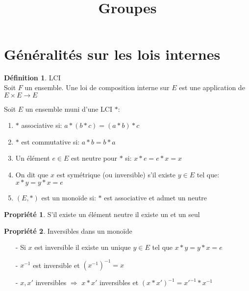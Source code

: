 \documentclass[fleqn]{article}
\title{Groupes}
\date{}
\theoremstyle{definition} \newtheorem*{defi}{D\'efinition}
\theoremstyle{definition} \newtheorem*{theo}{Th\'eor\`eme}
\theoremstyle{definition} \newtheorem*{coro}{Corollaire}
\theoremstyle{remark} \newtheorem*{rqs}{Remarques}
\theoremstyle{definition} \newtheorem*{prop}{Propri\'et\'e}
\begin{document}
\maketitle

\section{G\'en\'eralit\'es sur les lois internes}
\begin{defi} LCI \\
Soit $F$ un ensemble. Une loi de composition interne sur $E$ est une application de $E\times E \rightarrow E$
\end{defi}

Soit $E$ un ensemble muni d'une LCI $*$:
\begin{enumerate}
	\item $*$ associative si: $a*(b*c) = (a*b)*c$
	\item $*$ est commutative si: $a*b = b*a$
	\item Un \'el\'ement $e \in E$ est neutre pour $*$ si: $x*e = e*x = x$
	\item On dit que $x$ est sym\'etrique (ou inversible) s'il existe $y \in E$ tel que: $x*y = y*x = e$
	\item $(E,*)$ est un mono\"ide si: $*$ est associative et admet un neutre
\end{enumerate}

\begin{prop}
	S'il existe un \'el\'ement neutre il existe un et un seul
\end{prop}

\begin{prop} Inversibles dans un mono\"ide
	\begin{itemize}
		\item [-] Si $x$ est inversible il existe un unique $y \in E$ tel que $x*y = y*x = e$
		\item [-] $x^{-1}$ est inversible et $(x^{-1})^{-1} = x$
		\item [-] $x, x'$ inversibles $\Rightarrow$ $x*x'$ inversibles et $(x*x')^{-1} = x'^{-1}*x^{-1}$
	\end{itemize}
\end{prop}
\end{document}
